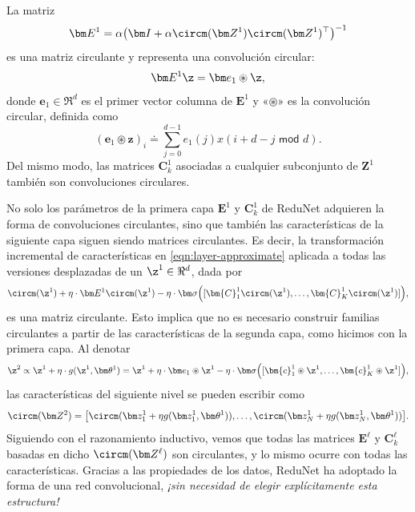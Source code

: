 \documentclass[../../book-main.tex]{subfiles}
\begin{document}
\begin{proposition}
    La matriz
    \begin{equation}
        \bm E^1 = \alpha\big(\bm I + \alpha \circm(\bm Z^1)
        \circm(\bm Z^1)^\top \big)^{-1}
    \end{equation}
    es una matriz circulante y representa una convolución circular:
    $$\bm E^1 \z = \bm e_1 \circledast \z,$$
    donde $\bm e_1 \in \Re^d$ es el primer vector columna de $\bm E^1$
    y «$\circledast$» es la convolución circular, definida como
    \begin{equation*}
        (\bm e_1 \circledast \bm z)_{i} \doteq \sum_{j=0}^{d-1}
        e_1(j) x(i+ d-j \,\, \textsf{mod} \,\,d).
    \end{equation*}
    Del mismo modo, las matrices $\bm C^1_k$ asociadas a cualquier subconjunto
    de $\bm Z^1$ también son convoluciones circulares.
    \label{prop:circular-conv-1}
\end{proposition}

No solo los parámetros de la primera capa $\bm E^1$ y $\bm{C}^1_k$ de
ReduNet adquieren la forma de convoluciones circulantes, sino que también las características de la siguiente capa
siguen siendo matrices circulantes.
Es decir, la transformación incremental de características en
\eqref{eqn:layer-approximate} aplicada a todas las versiones desplazadas de un
$\z^1 \in \Re^d$, dada por
\begin{equation}
    \circm(\z^1) + \eta \cdot \bm E^1 \circm(\z^1) - \eta \cdot \bm
    \sigma \Big([\bm{C}_1^1 \circm(\z^1), \ldots, \bm{C}^1_K
    \circm(\z^1)] \Big),
\end{equation}
es una matriz circulante. Esto implica que no es necesario
construir familias circulantes a partir de las características de la segunda capa, como hicimos
con la primera capa.
Al denotar
\begin{equation}
    \z^{2} \propto \z^{1} +\eta \cdot g(\z^{1}, \bm \theta^{1}) =
    \z^1 + \eta \cdot \bm e_{1} \circledast \z^{1} -  \eta \cdot \bm
    \sigma\Big([\bm{c}_{1}^{1} \circledast \z^{1}, \dots,
    \bm{c}^{1}_{K} \circledast \z^{1}]\Big),
    \label{eqn:approximate-convolution}
\end{equation}
las características del siguiente nivel se pueden escribir como
$$\circm(\bm Z^2) = \big[ \circm( \bm z_{1}^1 + \eta g( \bm z_{1}^1,
    \bm \theta^1)), \dots, \circm( \bm z_{N}^1 + \eta g(\bm z_{N}^1, \bm
\theta^1)) \big].$$
Siguiendo con el razonamiento inductivo, vemos que todas las matrices $\bm E^\ell$ y
$\bm C^\ell_k$ basadas en dicho $\circm(\bm Z^\ell)$ son circulantes, y
lo mismo ocurre con todas las características.
Gracias a las propiedades de los datos, ReduNet ha adoptado la forma
de una red convolucional, {\em ¡sin necesidad de elegir explícitamente
esta estructura!}
\end{document}
